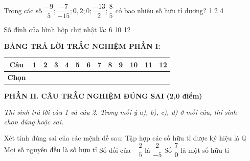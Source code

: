 \documentclass[12pt,a4paper]{article}
\begin{document}
\begin{ex}
Trong các số $\dfrac{-9}{5}; \dfrac{-7}{-15}; 0{,}2; 0; \dfrac{-13}{2}; \dfrac{8}{5}$ có bao nhiêu số hữu tỉ dương?
\choice
{1}
{}
{2}
{4}
\end{ex}

\begin{ex}
Số đỉnh của hình hộp chữ nhật là:
\choice
{6}
{}
{10}
{12}
\end{ex}


\vspace{1mm}
\noindent\textbf{BẢNG TRẢ LỜI TRẮC NGHIỆM PHẦN I:}
\begin{center}
\begin{tabular}{|c|c|c|c|c|c|c|c|c|c|c|c|c|}
\hline
\textbf{Câu} & \textbf{1} & \textbf{2} & \textbf{3} & \textbf{4} & \textbf{5} & \textbf{6} & \textbf{7} & \textbf{8} & \textbf{9} & \textbf{10} & \textbf{11} & \textbf{12} \\
\hline
\textbf{Chọn} & \rule{0pt}{0.48cm} & & & & & & & & & & & \\
\hline
\end{tabular}
\end{center}
\vspace{1mm}

\setcounter{ex}{0}
\noindent\textbf{\large PHẦN II. CÂU TRẮC NGHIỆM ĐÚNG SAI (2,0 điểm)}

\textit{Thí sinh trả lời câu 1 và câu 2. Trong mỗi ý a), b), c), d) ở mỗi câu, thí sinh chọn đúng hoặc sai.}

\vspace{1mm}
\begin{ex}
Xét tính đúng sai của các mệnh đề sau:
\choiceTF
{\True Tập hợp các số hữu tỉ được ký hiệu là $\mathbb{Q}$}
{\True Mọi số nguyên đều là số hữu tỉ}
{Số đối của $-\dfrac{2}{5}$ là $\dfrac{2}{-5}$}
{Số $\dfrac{7}{0}$ là một số hữu tỉ}
\end{ex}
\end{document}
